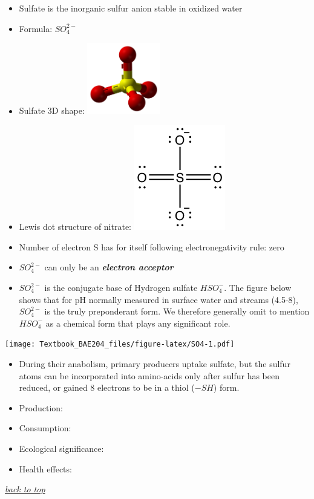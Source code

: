 \documentclass[]{book}
\providecommand{\tightlist}{%
  \setlength{\itemsep}{0pt}\setlength{\parskip}{0pt}}
\theoremstyle{definition}
\theoremstyle{definition}
\theoremstyle{definition}
\theoremstyle{remark}
\begin{document}
\begin{itemize}
\tightlist
\item
  Sulfate is the inorganic sulfur anion stable in oxidized water
\item
  Formula: \(SO_4^{2-}\)
\item
  Sulfate 3D shape:
  \includegraphics[width=0.25000\textwidth]{pictures/Sulfate-3D-balls.png}
\item
  Lewis dot structure of nitrate:
  \includegraphics{pictures/sulfate_lewis_structure.png}
\item
  Number of electron S has for itself following electronegativity rule:
  zero
\item
  \(SO_4^{2-}\) can only be an \emph{\textbf{electron acceptor}}
\item
  \(SO_4^{2-}\) is the conjugate base of Hydrogen sulfate \(HSO_4^{-}\).
  The figure below shows that for pH normally measured in surface water
  and streams (4.5-8), \(SO_4^{2-}\) is the truly preponderant form. We
  therefore generally omit to mention \(HSO_4^{-}\) as a chemical form
  that plays any significant role.
\end{itemize}

\texttt{[image: Textbook\_BAE204\_files/figure-latex/SO4-1.pdf]}

\begin{itemize}
\item
  During their anabolism, primary producers uptake sulfate, but the
  sulfur atoms can be incorporated into amino-acids only after sulfur
  has been reduced, or gained 8 electrons to be in a thiol (\(-SH\))
  form.
\item
  Production:
\item
  Consumption:
\item
  Ecological significance:
\item
  Health effects:
\end{itemize}

\emph{\protect\hyperlink{top}{back to top}}


\end{document}
